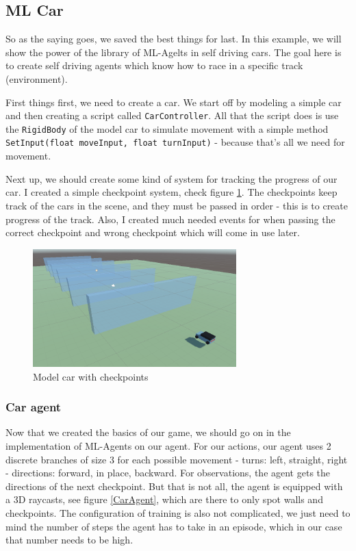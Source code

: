 \documentclass[a4paper,12pt,openright]{book}
\begin{document}
\subsection{ML Car}

So as the saying goes, we saved the best things for last. In this example, we will show the power of the library of ML-Agelts \cite{MLAgents} in self driving cars. The goal here is to create self driving agents which know how to race in a specific track (environment).

First things first, we need to create a car. We start off by modeling a simple car and then creating a script called \texttt{CarController}. All that the script does is use the \texttt{RigidBody} of the model car to simulate movement with a simple method \texttt{SetInput(float moveInput, float turnInput)} - because that's all we need for movement.

Next up, we should create some kind of system for tracking the progress of our car. I created a simple checkpoint system, check figure \ref{CarWithCheckpoints}. The checkpoints keep track of the cars in the scene, and they must be passed in order - this is to create progress of the track. Also, I created much needed events for when passing the correct checkpoint and wrong checkpoint which will come in use later.

\begin{figure}[h]
\begin{center}
\includegraphics[width=0.7\textwidth]{Images/CarWithCheckpoints.png}
\end{center}
\caption{Model car with checkpoints}
\label{CarWithCheckpoints}
\end{figure}


\subsubsection{Car agent}

Now that we created the basics of our game, we should go on in the implementation of ML-Agents on our agent. For our actions, our agent uses 2 discrete branches of size 3 for each possible movement - turns: left, straight, right - directions: forward, in place, backward. For observations, the agent gets the directions of the next checkpoint. But that is not all, the agent is equipped with a 3D raycasts, see figure \ref{CarAgent}, which are there  to only spot walls and checkpoints. The configuration of training is also not complicated, we just need to mind the number of steps the agent has to take in an episode, which in our case that number needs to be high.
\end{document}
